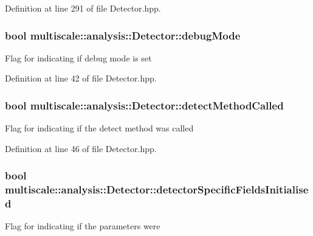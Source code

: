 Definition at line 291 of file Detector.\-hpp.

\hypertarget{classmultiscale_1_1analysis_1_1Detector_a4b42f796957efd6ee0b8cf7645494a65}{
\subsubsection[{debug\-Mode}]{\setlength{\rightskip}{0pt plus 5cm}bool multiscale\-::analysis\-::\-Detector\-::debug\-Mode\hspace{0.3cm}{\ttfamily [protected]}}}\label{classmultiscale_1_1analysis_1_1Detector_a4b42f796957efd6ee0b8cf7645494a65}
Flag for indicating if debug mode is set 

Definition at line 42 of file Detector.\-hpp.

\hypertarget{classmultiscale_1_1analysis_1_1Detector_ad565f471d9d7db7692da588ff0d6be2f}{
\subsubsection[{detect\-Method\-Called}]{\setlength{\rightskip}{0pt plus 5cm}bool multiscale\-::analysis\-::\-Detector\-::detect\-Method\-Called\hspace{0.3cm}{\ttfamily [protected]}}}\label{classmultiscale_1_1analysis_1_1Detector_ad565f471d9d7db7692da588ff0d6be2f}
Flag for indicating if the detect method was called 

Definition at line 46 of file Detector.\-hpp.

\hypertarget{classmultiscale_1_1analysis_1_1Detector_a172b91067670a14a7707f24dc218f2af}{
\subsubsection[{detector\-Specific\-Fields\-Initialised}]{\setlength{\rightskip}{0pt plus 5cm}bool multiscale\-::analysis\-::\-Detector\-::detector\-Specific\-Fields\-Initialised\hspace{0.3cm}{\ttfamily [protected]}}}\label{classmultiscale_1_1analysis_1_1Detector_a172b91067670a14a7707f24dc218f2af}
Flag for indicating if the parameters were 

